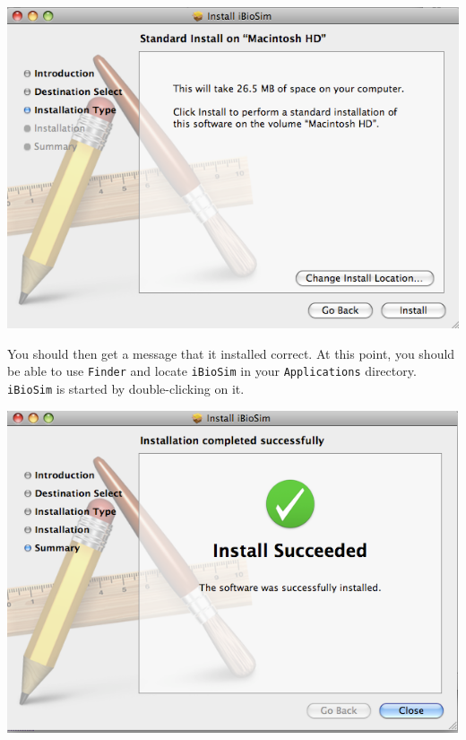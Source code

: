 \documentclass[titlepage,11pt]{article}
\begin{document}
\includegraphics[height=95mm]{screenshots/installType}

You should then get a message that it installed correct.  At this
point, you should be able to use {\tt Finder} and locate {\tt iBioSim}
in your {\tt Applications} directory.  {\tt iBioSim} is started by
double-clicking on it.

\includegraphics[height=95mm]{screenshots/success}
\end{document}
